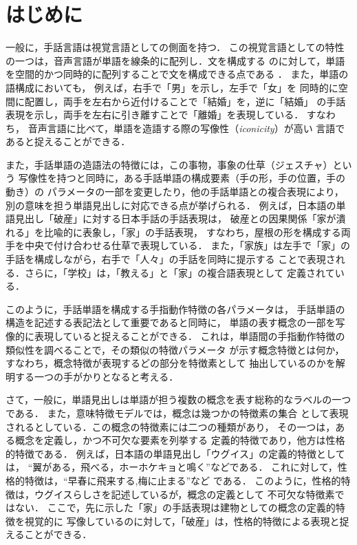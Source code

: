 \thispagestyle{plain}
\maketitle


\section{はじめに}\label{hajime}

一般に，手話言語は視覚言語としての側面を持つ．
この視覚言語としての特性の一つは，音声言語が単語を線条的に配列し．文を構成する
のに対して，単語を空間的かつ同時的に配列することで文を構成できる点である
\cite{Baker1980}．
また，単語の語構成においても，
例えば，右手で「男」を示し，左手で「女」を
同時的に空間に配置し，両手を左右から近付けることで「結婚」を，逆に「結婚」
の手話表現を示し，両手を左右に引き離すことで「離婚」を表現している．
すなわち，
音声言語に比べて，単語を造語する際の{\gt 写像性}（{\it iconicity}）が高い
言語であると捉えることができる．

また，手話単語の造語法の特徴には，この事物，事象の仕草（ジェスチャ）という
写像性を持つと同時に，ある手話単語の構成要素（手の形，手の位置，手の動き）の
パラメータの一部を変更したり，他の手話単語との複合表現により，
別の意味を担う単語見出しに対応できる点が挙げられる\cite{Ichida1994}．
例えば，日本語の単語見出し「破産」に対する日本手話の手話表現は，
破産との因果関係「家が潰れる」を比喩的に表象し，「家」の手話表現，
すなわち，屋根の形を構成する両手を中央で付け合わせる仕草で表現している．
また，「家族」は左手で「家」の手話を構成しながら，右手で「人々」の手話を同時に提示する
ことで表現される．さらに，「学校」は，「教える」と「家」の複合語表現として
定義されている\cite{Honna1994}．

このように，手話単語を構成する手指動作特徴の各パラメータは，
手話単語の構造を記述する表記法として重要である\cite{Yonekawa1984}と同時に，
単語の表す概念の一部を写像的に表現していると捉えることができる．
これは，単語間の手指動作特徴の類似性を調べることで，その類似の特徴パラメータ
が示す概念特徴とは何か，すなわち，概念特徴が表現するどの部分を特徴素として
抽出しているのかを解明する一つの手がかりとなると考える．

さて，一般に，単語見出しは単語が担う複数の概念を表す総称的なラベルの一つである．
また，意味特徴モデル\cite{Smith1974}では，概念は幾つかの特徴素の集合
として表現されるとしている．この概念の特徴素には二つの種類があり，
その一つは，ある概念を定義し，かつ不可欠な要素を列挙する
{\gt 定義的特徴}であり，他方は{\gt 性格的特徴}である．
例えば，日本語の単語見出し「ウグイス」の定義的特徴としては，
``翼がある，飛べる，ホーホケキョと鳴く''などである．
これに対して，性格的特徴は，``早春に飛来する,梅に止まる''など
である．
このように，性格的特徴は，ウグイスらしさを記述しているが，概念の定義として
不可欠な特徴素ではない\cite{Ohsima1986}．
ここで，先に示した「家」の手話表現は建物としての概念の定義的特徴を視覚的に
写像しているのに対して，「破産」は，性格的特徴による表現と捉えることができる．

